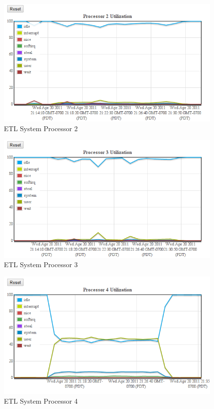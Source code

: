 \documentclass[twocolumn,letterpaper]{article}
\begin{document}
\begin{figure}[ht]
  \begin{center}
    \includegraphics[scale=0.37]{etl-c10-cpu-02}
  \end{center}
  \caption{ETL System Processor 2}
\end{figure}

\begin{figure}[ht]
  \begin{center}
    \includegraphics[scale=0.37]{etl-c10-cpu-03}
  \end{center}
  \caption{ETL System Processor 3}
\end{figure}

\begin{figure}[ht]
  \begin{center}
    \includegraphics[scale=0.37]{etl-c10-cpu-04}
  \end{center}
  \caption{ETL System Processor 4}
\end{figure}
\end{document}
